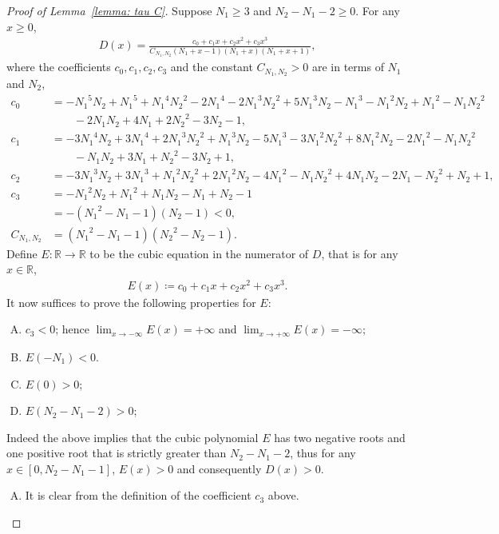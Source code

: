 \documentclass[10pt,a4paper]{amsart}
\begin{document}
	\begin{proof}[Proof of Lemma~\ref{lemma: tau C}]
		Suppose $N_1\geq 3$ and $N_2-N_1-2\geq0$. For any $x\geq0$,
		\begin{align*}
			D(x)=\frac{c_0+c_1x+c_2x^2+c_3x^3}{C_{N_1,N_2}(N_1+x-1)(N_1+x)(N_1+x+1)},
		\end{align*}
		where the coefficients $c_0,c_1,c_2,c_3$ and the constant $C_{N_1,N_2}>0$ are in terms of $N_1$ and $N_2$,
		\begin{align*}
			c_0&=-{N_1}^5{N_2}+{N_1}^5+{N_1}^4 {N_2}^2-2 {N_1}^4-2 {N_1}^3 {N_2}^2+5 {N_1}^3 {N_2}-{N_1}^3-{N_1}^2 {N_2}+{N_1}^2-{N_1} {N_2}^2\\
			&\qquad-2 {N_1} {N_2}+4 {N_1}+2 {N_2}^2-3 {N_2}-1, \\
			c_1&=-3 {N_1}^4 {N_2}+3 {N_1}^4+2 {N_1}^3 {N_2}^2+{N_1}^3 {N_2}-5 {N_1}^3-3 {N_1}^2 {N_2}^2+8 {N_1}^2 {N_2}-2 {N_1}^2-{N_1} {N_2}^2 \\
			&\qquad-{N_1} {N_2}+3 {N_1}+{N_2}^2-3 {N_2}+1, \\
			c_2&=-3 {N_1}^3 {N_2}+3 {N_1}^3+{N_1}^2 {N_2}^2+2 {N_1}^2 {N_2}-4 {N_1}^2-{N_1} {N_2}^2+4 {N_1} {N_2}-2 {N_1}-{N_2}^2+{N_2}+1, \\
			c_3
			&=-{N_1}^2{N_2}+{N_1}^2+{N_1} {N_2}-{N_1}+{N_2}-1 \\
			&=-({N_1}^2-N_1-1)(N_2-1)<0, \\
			C_{N_1,N_2}
			&= ({N_1}^2-N_1-1)({N_2}^2-N_2-1).
		\end{align*}
		Define $E:\mathbb{R}\to\mathbb{R}$ to be the cubic equation in the numerator of $D$, that is for any $x\in\mathbb{R}$,
		\begin{align*}
			E(x)\coloneqq{c_0+c_1x+c_2x^2+c_3x^3}.
		\end{align*}
		It now suffices to prove the following properties for $E$:
		\begin{enumerate}[A.]
			\item $c_3<0$; hence $\lim_{x\to-\infty} E(x) =+\infty$ and $\lim_{x\to+\infty} E(x) =-\infty$;
			\item $E(-N_1)<0$.
			\item $E(0)>0$;
			\item $E(N_2-N_1-2)>0$;
		\end{enumerate}
		Indeed the above implies that the cubic polynomial $E$ has two negative roots and one positive root that is strictly greater than $N_2-N_1-2$, thus for any $x\in[0,N_2-N_1-1]$, $E(x)>0$ and consequently $D(x)>0$.
		
		\begin{enumerate}[A.]
			\item It is clear from the definition of the coefficient $c_3$ above. 
			

\end{enumerate}
\end{proof}
\end{document}
